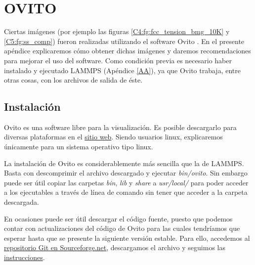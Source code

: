 
\chapter{OVITO} %

\label{AB} %


Ciertas imágenes (por ejemplo las figuras \ref{C4:fg:fcc_tension_bmg_10K} y \ref{C5:fg:ss_comp}) fueron realizadas utilizando el software Ovito \citep{stukowski10}. En el presente apéndice explicaremos cómo obtener dichas imágenes y daremos recomendaciones para mejorar el uso del software. Como condición previa es necesario haber instalado y ejecutado LAMMPS (Apéndice \ref{AA}), ya que Ovito trabaja, entre otras cosas, con los archivos de salida de éste.

\section{Instalación}
\label{AB_1}

Ovito es una software libre para la visualización. Es posible descargarlo para diversas plataformas en el \href{http://www.ovito.org/index.php/download}{sitio web}. Siendo usuarios linux, explicaremos únicamente para un sistema operativo tipo linux.

La instalación de Ovito es considerablemente más sencilla que la de LAMMPS. Basta con descomprimir el archivo descargado y ejecutar \textit{bin/ovito}. Sin embargo puede ser útil copiar las carpetas \textit{bin}, \textit{lib} y \textit{share} a \textit{usr/local/} para poder acceder a los ejecutables a través de línea de comando sin tener que acceder a la carpeta descargada.

En ocasiones puede ser útil descargar el código fuente, puesto que podemos contar con actualizaciones del código de Ovito para las cuales tendríamos que esperar hasta que se presente la siguiente versión estable. Para ello, accedemos al \href{http://sourceforge.net/p/ovito/git/ci/master/tree/}{repositorio Git en Sourceforge.net}, descargamos el archivo y seguimos las \href{http://www.ovito.org/manual/development.build_linux.html}{instrucciones}.

